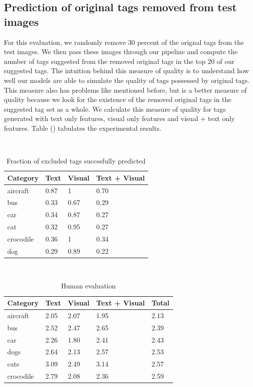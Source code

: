 \documentclass[12pt]{article}
\begin{document}
\subsection{Prediction of original tags removed from test images}
For this evaluation, we randomly remove 30 percent of the orignal tags from the test images. We
then pass these images through our pipeline and compute the number of tags suggested from the
removed original tags in the top 20 of our suggested tags. The intuition behind this measure of
quality is to understand how well our models are able to simulate the quality of tags possessed
by original tags. This measure also has problems like mentioned before, but is a better measure
of quality because we look for the existence of the removed original tags in the suggested tag
set as a whole. We calculate this measure of quality for tags generated with text only features,
visual only features and visual + text only features. Table () tabulates the experimental results.

\begin{table}
   \caption{Fraction of excluded tags succesfully predicted}
\begin{center}
    \begin{tabular}{|l l l l|}
\hline
Category & Text & Visual & Text + Visual \\
\hline
aircraft & 0.87 & 1 & 0.70 \\
bus  & 0.33 & 0.67 & 0.29 \\
car &  0.34 & 0.87 & 0.27 \\
cat &  0.32 & 0.95 & 0.27 \\
crocodile &  0.36 & 1 & 0.34 \\
dog  & 0.29 & 0.89 & 0.22 \\
\hline
\end{tabular}
\end{center}
\end{table}

\begin{table}
  \caption{Human evaluation}
\begin{center}
    \begin{tabular}{|l l l l l|}
\hline
Category & Text & Visual & Text + Visual & Total \\
\hline
aircraft & 2.05 & 2.07 & 1.95 & 2.13 \\
bus & 2.52 & 2.47 & 2.65 & 2.39 \\
car & 2.26 & 1.80 & 2.41 & 2.43 \\
dogs & 2.64 & 2.13 & 2.57 & 2.53 \\
cats & 3.09 & 2.49 & 3.14 & 2.57 \\
crocodile & 2.79 & 2.08 & 2.36 & 2.59 \\
\hline
\end{tabular}
\end{center}
\end{table}
\end{document}
